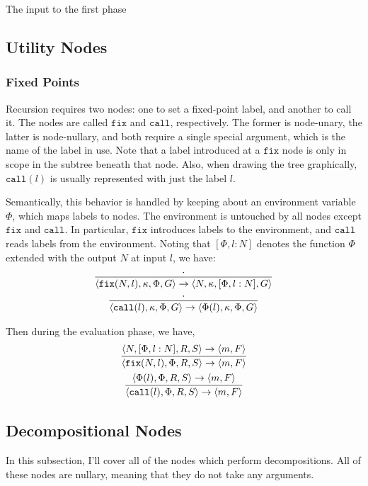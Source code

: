 \documentclass{article}
\newcommand {\fix}{\mathtt{fix}}
\newcommand {\call}{\mathtt{call}}
\begin{document}
The input to the first phase 

\subsection{Utility Nodes}

\subsubsection{Fixed Points}
Recursion requires two nodes: one to set a fixed-point label, and another to call it.  The nodes are called $\fix$ and $\call$, respectively.  The former is node-unary, the latter is node-nullary, and both require a single special argument, which is the name of the label in use.  Note that a label introduced at a $\fix$ node is only in scope in the subtree beneath that node.  Also, when drawing the tree graphically, $\call(l)$ is usually represented with just the label $l$.  

Semantically, this behavior is handled by keeping about an environment variable $\Phi$, which maps labels to nodes.  The environment is untouched by all nodes except $\fix$ and $\call$.  In particular, $\fix$ introduces labels to the environment, and $\call$ reads labels from the environment.  Noting that $[\Phi, l:N]$ denotes the function $\Phi$ extended with the output $N$ at input $l$, we have:
\begin{gather}
\infer{\langle \fix(N,l), \kappa, \Phi, G \rangle \to\langle N, \kappa, [\Phi, l:N], G \rangle}{ \cdot }
\\
\infer{\langle \call(l), \kappa, \Phi, G \rangle \to \langle \Phi(l), \kappa, \Phi, G \rangle }{\cdot}
\end{gather}

Then during the evaluation phase, we have,
\begin{gather}
\infer{\langle \fix(N,l), \Phi, R, S \rangle \to \langle m, F \rangle}{\langle N, [\Phi, l:N], R, S \rangle \to \langle m, F \rangle}
\\
\infer{\langle \call(l), \Phi, R, S \rangle \to \langle m, F \rangle}{\langle \Phi(l), \Phi, R, S \rangle \to \langle m, F \rangle}
\end{gather}

\subsection{Decompositional Nodes}
In this subsection, I'll cover all of the nodes which perform decompositions.  All of these nodes are nullary, meaning that they do not take any arguments.
\end{document}
